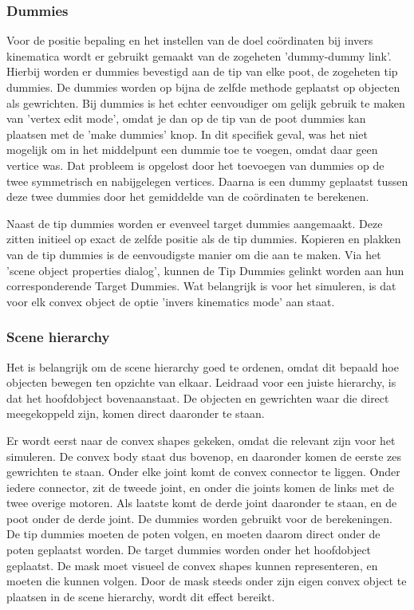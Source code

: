 \documentclass[10pt,a4paper]{article}
\begin{document}
\subsubsection{Dummies}
Voor de positie bepaling en het instellen van de doel co\"ordinaten bij invers kinematica wordt er gebruikt gemaakt van de zogeheten 'dummy-dummy link'. Hierbij worden er dummies bevestigd aan de tip van elke poot, de zogeheten tip dummies. De dummies worden op bijna de zelfde methode geplaatst op objecten als gewrichten. Bij dummies is het echter eenvoudiger om gelijk gebruik te maken van 'vertex edit mode', omdat je dan op de tip van de poot dummies kan plaatsen met de 'make dummies' knop. In dit specifiek geval, was het niet mogelijk om in het middelpunt een dummie toe te voegen, omdat daar geen vertice was. Dat probleem is opgelost door het toevoegen van dummies op de twee symmetrisch en nabijgelegen vertices. Daarna is een dummy geplaatst tussen deze twee dummies door het gemiddelde van de co\"ordinaten te berekenen.

Naast de tip dummies worden er evenveel target dummies aangemaakt. Deze zitten initieel op exact de zelfde positie als de tip dummies. Kopieren en plakken van de tip dummies is de eenvoudigste manier om die aan te maken. Via het 'scene object properties dialog', kunnen de Tip Dummies gelinkt worden aan hun corresponderende Target Dummies. Wat belangrijk is voor het simuleren, is dat voor elk convex object de optie 'invers kinematics mode' aan staat.
\subsubsection{Scene hierarchy}
Het is belangrijk om de scene hierarchy goed te ordenen, omdat dit bepaald hoe objecten bewegen ten opzichte van elkaar. Leidraad voor een juiste hierarchy, is dat het hoofdobject bovenaanstaat. De objecten en gewrichten waar die direct meegekoppeld zijn, komen direct daaronder te staan.

Er wordt eerst naar de convex shapes gekeken, omdat die relevant zijn voor het simuleren. De convex body staat dus bovenop, en daaronder komen de eerste zes gewrichten te staan. Onder elke joint komt de convex connector te liggen. Onder iedere connector, zit de tweede joint, en onder die joints komen de links met de twee overige motoren. Als laatste komt de derde joint daaronder te staan, en de poot onder de derde joint. De dummies worden gebruikt voor de berekeningen. De tip dummies moeten de poten volgen, en moeten daarom direct onder de poten geplaatst worden. De target dummies worden onder het hoofdobject geplaatst.
De mask moet visueel de convex shapes kunnen representeren, en moeten die kunnen volgen. Door de mask steeds onder zijn eigen convex object te plaatsen in de scene hierarchy, wordt dit effect bereikt.
\end{document}
